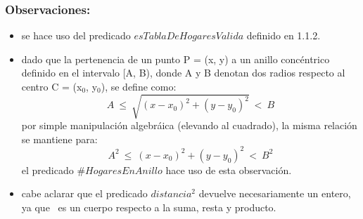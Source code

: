     \subsubsection{Observaciones:}
        \begin{itemize}
            \item se hace uso del predicado $esTablaDeHogaresValida$ definido en 1.1.2.
            \item dado que la pertenencia de un punto P = (x, y) a un anillo concéntrico definido en el intervalo 
            [A, B), donde A y B denotan dos radios respecto al centro C = (x$_{0}$, y$_{0}$), se define como: 
                \begin{equation}
                    A\ \leq\ \sqrt{(x - x_{0})^{2} + (y - y_{0})^{2}}\ <\ B
                \end{equation}
                por simple manipulación algebráica (elevando al cuadrado), la misma relación se mantiene para:
                \begin{equation}
                    A^{2}\ \leq\ (x - x_{0})^{2} + (y - y_{0})^{2}\ <\ B^{2}
                \end{equation}
                el predicado $\#HogaresEnAnillo$ hace uso de esta observaci\'on.
            \item cabe aclarar que el predicado $distancia^{2}$ devuelve necesariamente un entero, ya que \ent\ es un cuerpo respecto a
            la suma, resta y producto. 
        \end{itemize}